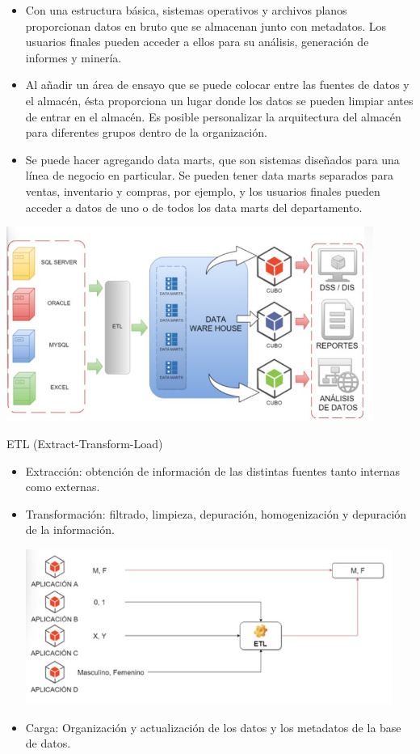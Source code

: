 \documentclass[preprint,12pt]{elsarticle}
\begin{document}
\begin{itemize}
	\item Con una estructura básica, sistemas operativos y archivos planos proporcionan datos en bruto que se almacenan junto con metadatos. Los usuarios finales pueden acceder a ellos para su análisis, generación de informes y minería.
	\item Al añadir un área de ensayo que se puede colocar entre las fuentes de datos y el almacén, ésta proporciona un lugar donde los datos se pueden limpiar antes de entrar en el almacén. Es posible personalizar la arquitectura del almacén para diferentes grupos dentro de la organización.
	\item Se puede hacer agregando data marts, que son sistemas diseñados para una línea de negocio en particular. Se pueden tener data marts separados para ventas, inventario y compras, por ejemplo, y los usuarios finales pueden acceder a datos de uno o de todos los data marts del departamento.
\end{itemize}

\begin{center}
	\includegraphics[width=12cm]{./Imagenes/imagen1} 
\end{center}

ETL (Extract-Transform-Load)\\
\begin{itemize}
	\item Extracción: obtención de información de las distintas fuentes tanto internas como externas.
	\item Transformación: filtrado, limpieza, depuración, homogenización y depuración de la información.

\begin{center}
	\includegraphics[width=12cm]{./Imagenes/imagen2} 
\end{center}

	\item Carga: Organización y actualización de los datos y los metadatos de la base de datos.
\end{itemize}
\end{document}
